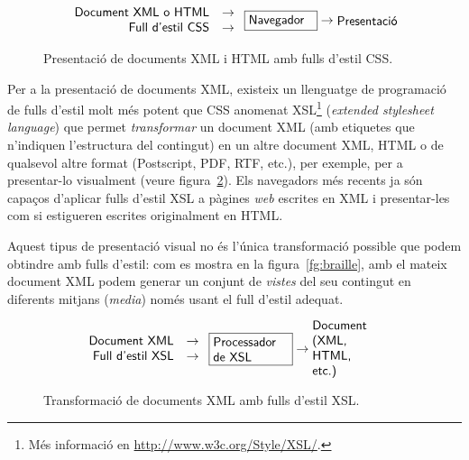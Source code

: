 \begin{figure}
$$
\left.
\begin{array}{rcl}
\mbox{\textsf{Document XML o HTML}} & 
\to \\
\mbox{\textsf{Full d'estil CSS}} &\to 
 \\
\end{array}
\right.
\mbox{\framebox{\parbox{1.8cm}{\textsf{Navegador}}}}
\to \mbox{\parbox{1.8cm}{\textsf{Presentació}}}
$$
\caption{Presentació de documents XML i HTML amb fulls d'estil CSS.}
\label{fg:CSS}
\end{figure}


Per a la presentació de documents XML, existeix un llenguatge de
programació de fulls d'estil molt més potent que CSS anomenat
XSL\footnote{Més informació en \url{http://www.w3c.org/Style/XSL/}.}
(\emph{extended stylesheet language}) que permet \emph{transformar} un
document XML (amb etiquetes que n'indiquen l'estructura del contingut)
en un altre document XML, HTML o de qualsevol altre format
(Postscript, PDF, RTF, etc.), per exemple, per a presentar-lo
visualment (veure figura~\ref{fg:XSL}).  Els navegadors més recents ja
són capaços d'aplicar fulls d'estil XSL a pàgines \emph{web} escrites
en XML i presentar-les com si estigueren escrites originalment en
HTML.


Aquest tipus de presentació visual no és l'única transformació
possible que podem obtindre amb fulls d'estil: com es mostra en la
figura~\ref{fg:braille}, amb el mateix document XML podem generar un
conjunt de \emph{vistes} del seu contingut en diferents mitjans
(\emph{media}) només usant el full d'estil adequat.

\begin{figure}
$$
\left.
\begin{array}{rcl}
\mbox{\textsf{Document XML}} & 
\to \\
\mbox{\textsf{Full d'estil XSL}} &\to 
 \\
\end{array}
\right.
\mbox{\framebox{\parbox{2.1cm}{\textsf{Processador de XSL}}}}
\to \mbox{\parbox{2.1cm}{\textsf{Document (XML, HTML, etc.) }}}
$$
\caption{Transformació de documents XML amb fulls d'estil XSL.}
\label{fg:XSL}
\end{figure}

